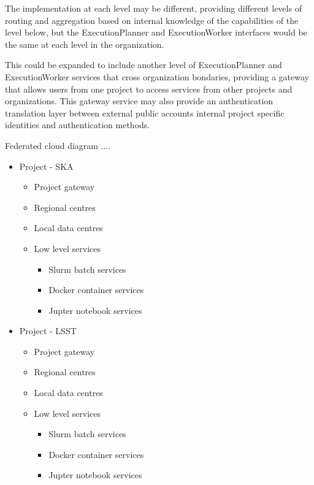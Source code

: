 \documentclass[11pt,a4paper]{ivoa}
\newcommand{\execplanner} {ExecutionPlanner}
\newcommand{\execworker} {ExecutionWorker}
\begin{document}
The implementation at each level may be different, providing different levels of routing
and aggregation based on internal knowledge of the capabilities of the level below,
but the \execplanner{} and \execworker{} interfaces would be the same at each level
in the organization.

This could be expanded to include another level of \execplanner{} and \execworker{} services that
cross organization bondaries, providing a gateway that allows users from one project to access services
from other projects and organizations. This gateway service may also provide an authentication translation
layer between external public accounts internal project specific identities and authentication methods.

Federated cloud diagram ....

\begin{itemize}
    \item Project - SKA
    \begin{itemize}
        \item Project gateway
        \item Regional centres
        \item Local data centres
        \item Low level services
        \begin{itemize}
            \item Slurm batch services
            \item Docker container services
            \item Jupter notebook services
        \end{itemize}
    \end{itemize}
\end{itemize}

\begin{itemize}
    \item Project - LSST
    \begin{itemize}
        \item Project gateway
        \item Regional centres
        \item Local data centres
        \item Low level services
        \begin{itemize}
            \item Slurm batch services
            \item Docker container services
            \item Jupter notebook services
        \end{itemize}
    \end{itemize}
\end{itemize}
\end{document}
